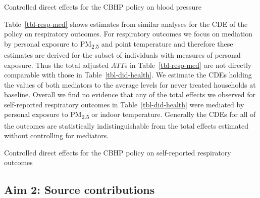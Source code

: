 \documentclass[
  letterpaper,
  DIV=11,
  numbers=noendperiod]{scrartcl}
\makeatletter
\renewenvironment{table}%
   {\renewcommand\familydefault\sfdefault
    \@float{table}}
   {\end@float}
\makeatother
\begin{document}
\begin{table}

\caption{\label{tbl-bp-med}Controlled direct effects for the CBHP policy
on blood pressure}

\centering{

}

\end{table}%

Table~\ref{tbl-resp-med} shows estimates from similar analyses for the
CDE of the policy on respiratory outcomes. For respiratory outcomes we
focus on mediation by personal exposure to PM\textsubscript{2.5} and
point temperature and therefore these estimates are derived for the
subset of individuals with measures of personal exposure. Thus the total
adjusted \(ATT\)s in Table~\ref{tbl-resp-med} are not directly
comparable with those in Table~\ref{tbl-did-health}. We estimate the
CDEs holding the values of both mediators to the average levels for
never treated households at baseline. Overall we find no evidence that
any of the total effects we observed for self-reported respiratory
outcomes in Table~\ref{tbl-did-health} were mediated by personal
exposure to PM\textsubscript{2.5} or indoor temperature. Generally the
CDEs for all of the outcomes are statistically indistinguishable from
the total effects estimated without controlling for mediators.

\begin{table}

\caption{\label{tbl-resp-med}Controlled direct effects for the CBHP
policy on self-reported respiratory outcomes}

\centering{

}

\end{table}%

\subsection{Aim 2: Source
contributions}\label{aim-2-source-contributions}
\end{document}
